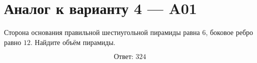 \documentclass[12pt,a4paper]{article}
\begin{document}
\section*{Аналог к варианту 4 — A01}

Сторона основания правильной шестиугольной пирамиды равна \(6\), боковое ребро равно \(12\). Найдите объём пирамиды.

\begin{center}
\end{center}

\[
\boxed{\text{Ответ: }324}
\]
\end{document}

